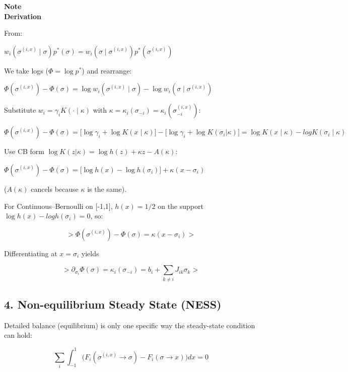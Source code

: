 \documentclass{article}
\begin{document}
\begin{framed}
\textbf{Note}\\
\textbf{Derivation}

From:

$w_i(\sigma^{(i,x)}\mid\sigma) p^\ast(\sigma) = w_i(\sigma\mid\sigma^{(i,x)}) p^\ast(\sigma^{(i,x)})$

We take logs ($\Phi=\log p^\ast$) and rearrange:

$\Phi(\sigma^{(i,x)}) - \Phi(\sigma) = \log w_i(\sigma^{(i,x)} \mid \sigma) - \log w_i(\sigma \mid \sigma^{(i,x)})$

Substitute $w_i = \gamma_i K(\cdot \mid \kappa)$ with $\kappa = \kappa_i(\sigma_{ -i}) = \kappa_i(\sigma^{(i,x)}_{ -i})$:

$\Phi(\sigma^{(i,x)}) - \Phi(\sigma) = \big[\log \gamma_i + \log K(x \mid \kappa)\big] - \big[\log \gamma_i + \log K(\sigma_i|\kappa)\big] = \log K(x \mid \kappa) - log K(\sigma_i \mid \kappa)$

Use CB form $\log K(z|\kappa) = \log h(z) + \kappa z - A(\kappa)$:

$\Phi(\sigma^{(i,x)}) - \Phi(\sigma) = \big[ \log h(x) - \log h(\sigma_i)\big] + \kappa(x - \sigma_i)$

($A(\kappa)$ cancels because $\kappa$ is the same).

For Continuous--Bernoulli on [-1,1], $h(x) = 1/2$ on the support \Rightarrow $\log h(x) - log h(\sigma_i) = 0$, so:

\begin{equation}
> \Phi(\sigma^{(i,x)}) − \Phi(σ) = \kappa(x − \sigma_i)
>
\end{equation}

Differentiating at $x=\sigma_i$ yields

\begin{equation}
> \partial_{\sigma_i}\Phi(\sigma) = \kappa_i(\sigma_{-i}) = b_i + \sum_{k\neq i} J_{ik} \sigma_k
>
\end{equation}
\end{framed}

\subsection{4. Non-equilibrium Steady State (NESS)}

Detailed balance (equilibrium) is only one specific way the steady-state condition can hold:

\begin{equation}
\sum_i \int_{-1}^1 \Big(F_i(\sigma^{(i,x)}\to\sigma)-F_i(\sigma\to x)\Big) dx = 0
\end{equation}
\end{document}
